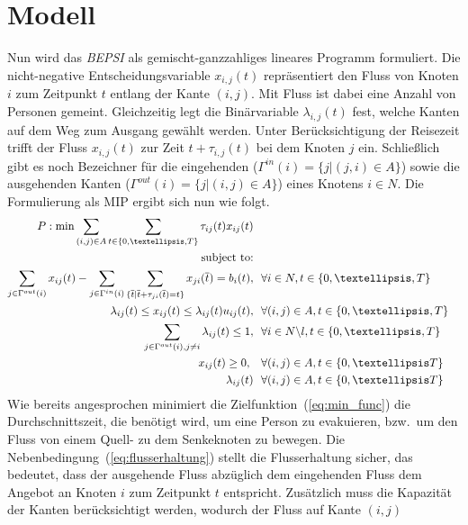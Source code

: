 \documentclass[a4paper, 11pt]{scrreprt}
\begin{document}
\section{Modell}
\label{sec:modell}
Nun wird das \textit{BEPSI} als gemischt-ganzzahliges lineares Programm formuliert.
Die nicht-negative Entscheidungsvariable $x_{i,j}(t)$ repräsentiert den Fluss
von Knoten $i$ zum Zeitpunkt $t$ entlang der Kante $(i,j)$.
Mit Fluss ist dabei eine Anzahl von Personen gemeint. Gleichzeitig legt die
Binärvariable $\lambda_{i,j}(t)$ fest, welche Kanten auf dem Weg zum Ausgang
gewählt werden. Unter Berücksichtigung der Reisezeit trifft der Fluss
$x_{i,j}(t)$ zur Zeit $t + \tau_{i,j}(t)$ bei dem Knoten $j$ ein. Schließlich
gibt es noch Bezeichner für die eingehenden
($\Gamma^{in}(i) = \{j|(j,i) \in A\}$)
sowie die ausgehenden Kanten
($\Gamma^{out}(i) = \{j|(i,j) \in A\}$)
eines Knotens $i \in N$.
Die Formulierung als MIP ergibt sich nun wie folgt.
\begin{align}
  P:\text{min}  \sum_{(i,j)\in A}\sum_{t\in\{0,…,T\}}\tau_{ij}(t)x_{ij}(t) \label{eq:min_func} \\
  \text{subject to:}\notag\\
  \sum_{j \in \Gamma^{out} (i)}x_{ij}(t) - \sum_{j \in \Gamma^{in} (i)}\sum_{\{\overline{t}|\overline{t}+\tau_{ji}(\overline{t}) = t\}}x_{ji}(\overline{t}) = b_i(t), &\,\,\,\, \forall i \in N, t \in \{0,…,T\} \label{eq:flusserhaltung}\\
  \lambda_{ij}(t) \leq x_{ij}(t) \leq \lambda_{ij}(t)u_{ij}(t), &\,\,\,\, \forall (i,j) \in A, t \in \{0,…,T\} \label{eq:kapazitaet} \\
  \sum_{j \in \Gamma^{out} (i), j \neq i} \lambda_{ij}(t) \leq 1, &\,\,\,\, \forall i \in N\backslash l, t \in \{0,…,T\} \label{eq:shared_information} \\
  x_{ij}(t) \geq 0,\,\, &\,\,\,\, \forall (i,j) \in A, t \in \{0,…T\} \label{eq:non_negative}\\
  \lambda_{ij}(t)&\,\,\,\, \forall (i,j) \in A, t \in \{0,…T\}
\end{align}
Wie bereits angesprochen minimiert die Zielfunktion~(\ref{eq:min_func}) die Durchschnittszeit, die benötigt wird,
um eine Person zu evakuieren, bzw.\ um den Fluss von einem Quell- zu dem Senkeknoten zu bewegen.
Die Nebenbedingung~(\ref{eq:flusserhaltung}) stellt die Flusserhaltung sicher, das bedeutet, dass der
ausgehende Fluss abzüglich dem eingehenden Fluss dem Angebot an Knoten $i$ zum Zeitpunkt $t$ entspricht.
Zusätzlich muss die Kapazität der Kanten berücksichtigt werden, wodurch der Fluss auf Kante $(i,j)$
\end{document}
